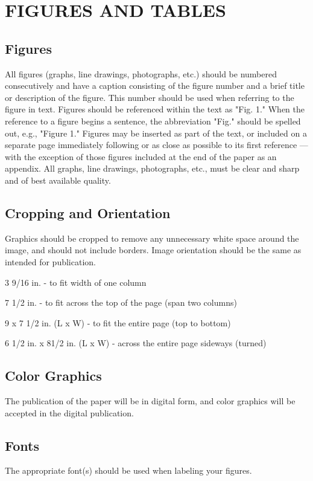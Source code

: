 \documentclass{ISCGRS}
\begin{document}
\section { FIGURES AND TABLES}

\subsection{Figures}
All figures (graphs, line drawings, photographs, etc.) should be numbered consecutively and have a caption consisting of the figure number and a brief title or description of the figure. This number should be used when referring to the figure in text. Figures should be referenced within the text as "Fig. 1." When the reference to a figure begins a sentence, the abbreviation "Fig." should be spelled out, e.g., "Figure 1."
Figures may be inserted as part of the text, or included on a separate page immediately following or as close as possible to its first reference — with the exception of those figures included at the end of the paper as an appendix.
All graphs, line drawings, photographs, etc., must be clear and sharp and of best available quality.

\subsection{Cropping and Orientation}
Graphics should be cropped to remove any unnecessary white space around the image, and should not include borders.
Image orientation should be the same as intended for publication.

3 9/16 in. - to fit width of one column

7 1/2 in. - to fit across the top of the page (span two columns)

9 x 7 1/2 in. (L x W) - to fit the entire page (top to bottom)

6 1/2 in. x 81/2 in. (L x W) - across the entire page sideways (turned)

\subsection{Color Graphics}
The publication of the paper will be in digital form, and color graphics will be accepted in the digital publication.

\subsection{Fonts}
The appropriate font(s) should be used when labeling your figures.
\end{document}
